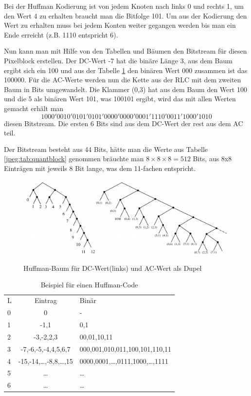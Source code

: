 Bei der Huffman Kodierung ist von jedem Knoten nach links 0 und rechts 1, um den Wert 4 zu erhalten braucht man die Bitfolge 101.
Um aus der Kodierung den Wert zu erhalten muss bei jedem Konten weiter gegangen werden bis man ein Ende erreicht (z.B. 1110 entspricht 6).

Nun kann man mit Hilfe von den Tabellen und Bäumen den Bitstream für diesen Pixelblock erstellen.
Der DC-Wert -7 hat die binäre Länge 3, aus dem Baum ergibt sich ein 100 und aus der Tabelle \ref{jpeg:tab:huffman} den binären Wert 000 zusammen ist das 100000.
Für die AC-Werte werden nun die Kette aus der RLC mit dem zweiten Baum in Bits umgewandelt.
Die Klammer (0,3) hat aus dem Baum den Wert 100 und die 5 als binären Wert 101, was 100101 ergibt, wird das mit allen Werten gemacht erhält man
\begin{equation}
    1000'0010'0101'0101'0000'0000'0001'1110'0011'1000'1010    
\end{equation}
diesen Bitstream.
Die ersten 6 Bits sind aus dem DC-Wert der rest aus dem AC teil.

Der Bitstream besteht aus 44 Bits, hätte man die Werte aus Tabelle \ref{jpeg:tab:quantblock} genommen bräuchte man \(8\times8\times8=512\) Bits, aus 8x8 Einträgen mit jeweils 8 Bit lange, was dem 11-fachen entspricht.
 

\begin{figure}
    \centering
    \includegraphics[width=\textwidth]{papers/jpeg/pictures/huffman.pdf}
    \caption{Huffman-Baum für DC-Wert(links) und AC-Wert als Dupel 
        \label{jpeg:fig:huffman}}
\end{figure}

\begin{table}[b]
    \centering
    \begin{tabular}{lcl}
        L & Eintrag                     & Binär\\
        0 & 0                           & - \\
        1 & -1,1                        & 0,1 \\
        2 & -3,-2,2,3                   & 00,01,10,11 \\
        3 & -7,-6,-5,-4,4,5,6,7         & 000,001,010,011,100,101,110,11 \\
        4 & -15,-14,\dots,-8,8,\dots,15 & 0000,0001,\dots,0111,1000,\dots,1111 \\
        5 & \dots                       & \dots \\
        6 & \dots                       & \dots                           
    \end{tabular}
    \caption{Beispiel für einen Huffman-Code
        \label{jpeg:tab:huffman}}
\end{table}
